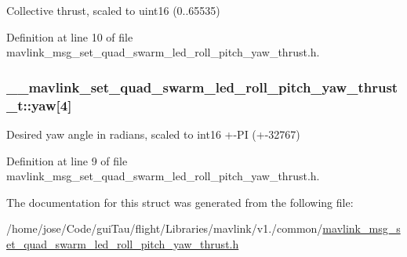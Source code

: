 Collective thrust, scaled to uint16 (0..65535) 



Definition at line 10 of file mavlink\-\_\-msg\-\_\-set\-\_\-quad\-\_\-swarm\-\_\-led\-\_\-roll\-\_\-pitch\-\_\-yaw\-\_\-thrust.\-h.

\hypertarget{struct____mavlink__set__quad__swarm__led__roll__pitch__yaw__thrust__t_a5107c51df97340cfa9efa6f923b79193}{
\subsubsection[{yaw}]{ \-\_\-\-\_\-mavlink\-\_\-set\-\_\-quad\-\_\-swarm\-\_\-led\-\_\-roll\-\_\-pitch\-\_\-yaw\-\_\-thrust\-\_\-t\-::yaw\mbox{[}4\mbox{]}}}\label{struct____mavlink__set__quad__swarm__led__roll__pitch__yaw__thrust__t_a5107c51df97340cfa9efa6f923b79193}


Desired yaw angle in radians, scaled to int16 +-\/\-P\-I (+-\/32767) 



Definition at line 9 of file mavlink\-\_\-msg\-\_\-set\-\_\-quad\-\_\-swarm\-\_\-led\-\_\-roll\-\_\-pitch\-\_\-yaw\-\_\-thrust.\-h.



The documentation for this struct was generated from the following file\-:\begin{DoxyCompactItemize}
\item 
/home/jose/\-Code/gui\-Tau/flight/\-Libraries/mavlink/v1./common/\hyperlink{mavlink__msg__set__quad__swarm__led__roll__pitch__yaw__thrust_8h}{mavlink\-\_\-msg\-\_\-set\-\_\-quad\-\_\-swarm\-\_\-led\-\_\-roll\-\_\-pitch\-\_\-yaw\-\_\-thrust.\-h}\end{DoxyCompactItemize}
